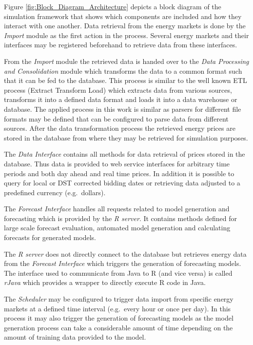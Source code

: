 Figure \ref{fig:Block_Diagram_Architecture} depicts a block diagram of the simulation framework that shows which components are included and how they interact with one another. Data retrieval from the energy markets is done by the \textit{Import} module as the first action in the process. Several energy markets and their interfaces may be registered beforehand to retrieve data from these interfaces. 

From the \textit{Import} module the retrieved data is handed over to the \textit{Data Processing and Consolidation} module which transforms the data to a common format such that it can be fed to the database. This process is similar to the well known ETL process (Extract Transform Load)\cite{vassiliadis2002conceptual} which extracts data from various sources, transforms it into a defined data format and loads it into a data warehouse or database. The applied process in this work is similar as parsers for different file formats may be defined that can be configured to parse data from different sources. After the data transformation process the retrieved energy prices are stored in the database from where they may be retrieved for simulation purposes. 

The \textit{Data Interface} contains all methods for data retrieval of prices stored in the database. Thus data is provided to web service interfaces for arbitrary time periods and both day ahead and real time prices. In addition it is possible to query for local or DST corrected bidding dates or retrieving data adjusted to a predefined currency (e.g.~dollars). 

The \textit{Forecast Interface} handles all requests related to model generation and forecasting which is provided by the \textit{R server}. It contains methods defined for large scale forecast evaluation, automated model generation and calculating forecasts for generated models. 

The \textit{R server} does not directly connect to the database but retrieves energy data from the \textit{Forecast Interface} which triggers the generation of forecasting models. The interface used to communicate from Java to R (and vice versa) is called \textit{rJava} \cite{rforge2007rjava} which provides a wrapper to directly execute R code in Java. 

The \textit{Scheduler} may be configured to trigger data import from specific energy markets at a defined time interval (e.g.~every hour or once per day). In this process it may also trigger the generation of forecasting models as the model generation process can take a considerable amount of time depending on the amount of training data provided to the model.

